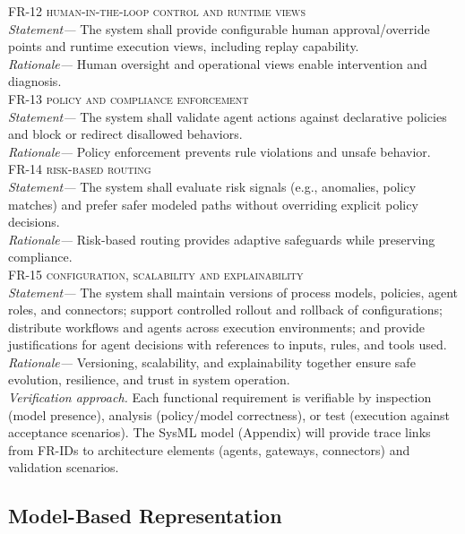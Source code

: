 \noindent \textsc{FR-12 human-in-the-loop control and runtime views} \\
\indent \emph{Statement—} The system shall provide configurable human approval/override points and runtime execution views, including replay capability. \\
\indent \emph{Rationale—} Human oversight and operational views enable intervention and diagnosis. \\

\noindent \textsc{FR-13 policy and compliance enforcement} \\
\indent \emph{Statement—} The system shall validate agent actions against declarative policies and block or redirect disallowed behaviors. \\
\indent \emph{Rationale—} Policy enforcement prevents rule violations and unsafe behavior. \\

\noindent \textsc{FR-14 risk-based routing} \\
\indent \emph{Statement—} The system shall evaluate risk signals (e.g., anomalies, policy matches) and prefer safer modeled paths without overriding explicit policy decisions. \\
\indent \emph{Rationale—} Risk-based routing provides adaptive safeguards while preserving compliance. \\

\noindent \textsc{FR-15 configuration, scalability and explainability} \\
\indent \emph{Statement—} The system shall maintain versions of process models, policies, agent roles, and connectors; support controlled rollout and rollback of configurations; distribute workflows and agents across execution environments; and provide justifications for agent decisions with references to inputs, rules, and tools used. \\
\indent \emph{Rationale—} Versioning, scalability, and explainability together ensure safe evolution, resilience, and trust in system operation. \\

\noindent\emph{Verification approach.} Each functional requirement is verifiable by inspection (model presence), analysis (policy/model correctness), or test (execution against acceptance scenarios). The SysML model (Appendix) will provide trace links from FR-IDs to architecture elements (agents, gateways, connectors) and validation scenarios.

\subsection{Model-Based Representation}\label{subsec:req-model}

